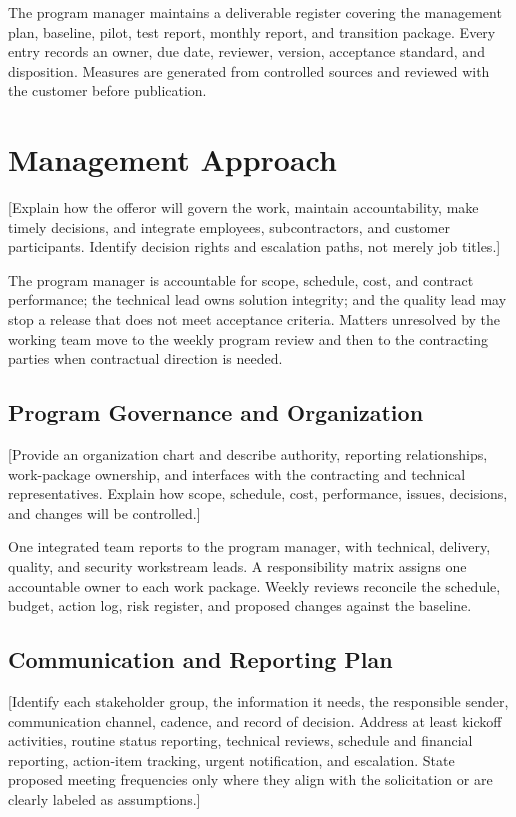 The program manager maintains a deliverable register covering the management
plan, baseline, pilot, test report, monthly report, and transition package.
Every entry records an owner, due date, reviewer, version, acceptance standard,
and disposition. Measures are generated from controlled sources and reviewed
with the customer before publication.

\section{Management Approach}
\label{sec:management-approach}
[Explain how the offeror will govern the work, maintain accountability, make
timely decisions, and integrate employees, subcontractors, and customer
participants. Identify decision rights and escalation paths, not merely job
titles.]

The program manager is accountable for scope, schedule, cost, and contract
performance; the technical lead owns solution integrity; and the quality lead
may stop a release that does not meet acceptance criteria. Matters unresolved
by the working team move to the weekly program review and then to the
contracting parties when contractual direction is needed.

\subsection{Program Governance and Organization}
[Provide an organization chart and describe authority, reporting relationships,
work-package ownership, and interfaces with the contracting and technical
representatives. Explain how scope, schedule, cost, performance, issues,
decisions, and changes will be controlled.]

One integrated team reports to the program manager, with technical, delivery,
quality, and security workstream leads. A responsibility matrix assigns one
accountable owner to each work package. Weekly reviews reconcile the schedule,
budget, action log, risk register, and proposed changes against the baseline.

\subsection{Communication and Reporting Plan}
[Identify each stakeholder group, the information it needs, the responsible
sender, communication channel, cadence, and record of decision. Address at
least kickoff activities, routine status reporting, technical reviews,
schedule and financial reporting, action-item tracking, urgent notification,
and escalation. State proposed meeting frequencies only where they align with
the solicitation or are clearly labeled as assumptions.]

